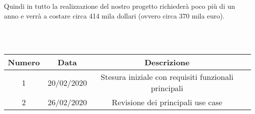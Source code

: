 \noindent Quindi in tutto la realizzazione del nostro progetto richiederà poco più di un anno e verrà a costare circa 414 mila dollari (ovvero circa 370 mila euro).

\begin{table}[b]
 \\ \\
\begin{tabular}{|c | c | c | c|} 
 	\hline
	 Numero & Data & Descrizione \\ [0.5ex] 
	\hline\hline
	1 & 20/02/2020 & Stesura iniziale con requisiti funzionali principali \\
	\hline
	2 & 26/02/2020 & Revisione dei principali use case\\
	\hline
\end{tabular}
\end{table}